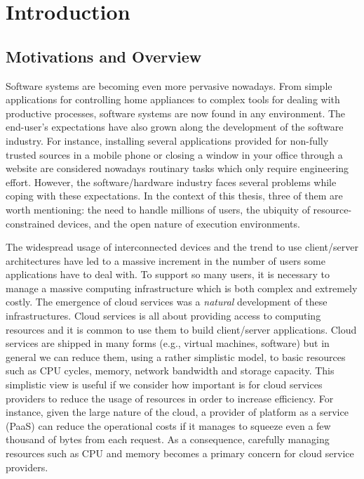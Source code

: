 

\chapter{Introduction}


\section{Motivations and Overview}

Software systems are becoming even more pervasive nowadays.
From simple applications for controlling home appliances to complex tools for dealing with productive processes, software systems are now found in any environment.
The end-user's expectations have also grown along the development of the software industry.
For instance, installing several applications provided for non-fully trusted sources in a mobile phone or closing a window in your office through a website are considered nowadays routinary tasks which only require engineering effort.
However, the software/hardware industry faces several problems while coping with these expectations.
In the context of this thesis, three of them are worth mentioning: the need to handle millions of users, the ubiquity of resource-constrained devices, and the
open nature of execution environments.   

The widespread usage of interconnected devices and the trend to use client/server architectures have led to a massive increment in the number of users some applications have to deal with.
To support so many users, it is necessary to manage a massive computing infrastructure which is both complex and extremely costly.
The emergence of cloud services was a \textit{natural} development of these infrastructures.
Cloud services is all about providing access to computing resources and it is common to use them to build client/server applications.
Cloud services are shipped in many forms (e.g., virtual machines, software) but in general we can reduce them, using a rather simplistic model, to basic resources such as CPU cycles, memory, network bandwidth and storage capacity.
This simplistic view is useful if we consider how important is for cloud services providers to reduce the usage of resources in order to increase efficiency.
For instance, given the large nature of the cloud, a provider of platform as a service (PaaS) can reduce the operational costs if it manages to squeeze even a few thousand of bytes from each request.
As a consequence, carefully managing resources such as CPU and memory becomes a primary concern for cloud service providers.

